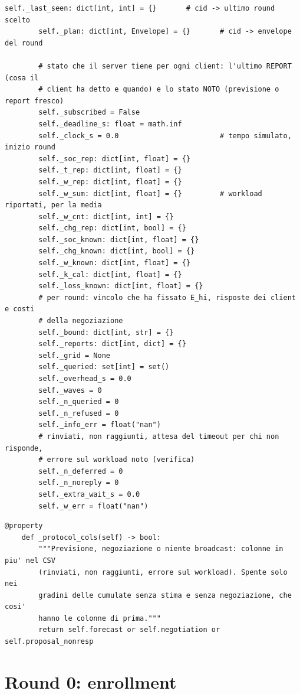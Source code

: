 \documentclass[11pt,a4paper]{article}
\begin{document}
\begin{lstlisting}[style=py,firstnumber=212,caption={\texttt{tesifl/strategies/sage\_smart.py}, lines 212--312}]
        self._last_seen: dict[int, int] = {}       # cid -> ultimo round scelto
        self._plan: dict[int, Envelope] = {}       # cid -> envelope del round

        # stato che il server tiene per ogni client: l'ultimo REPORT (cosa il
        # client ha detto e quando) e lo stato NOTO (previsione o report fresco)
        self._subscribed = False
        self._deadline_s: float = math.inf
        self._clock_s = 0.0                        # tempo simulato, inizio round
        self._soc_rep: dict[int, float] = {}
        self._t_rep: dict[int, float] = {}
        self._w_rep: dict[int, float] = {}
        self._w_sum: dict[int, float] = {}         # workload riportati, per la media
        self._w_cnt: dict[int, int] = {}
        self._chg_rep: dict[int, bool] = {}
        self._soc_known: dict[int, float] = {}
        self._chg_known: dict[int, bool] = {}
        self._w_known: dict[int, float] = {}
        self._k_cal: dict[int, float] = {}
        self._loss_known: dict[int, float] = {}
        # per round: vincolo che ha fissato E_hi, risposte dei client e costi
        # della negoziazione
        self._bound: dict[int, str] = {}
        self._reports: dict[int, dict] = {}
        self._grid = None
        self._queried: set[int] = set()
        self._overhead_s = 0.0
        self._waves = 0
        self._n_queried = 0
        self._n_refused = 0
        self._info_err = float("nan")
        # rinviati, non raggiunti, attesa del timeout per chi non risponde,
        # errore sul workload noto (verifica)
        self._n_deferred = 0
        self._n_noreply = 0
        self._extra_wait_s = 0.0
        self._w_err = float("nan")
\end{lstlisting}

\begin{lstlisting}[style=py,firstnumber=314,caption={\texttt{tesifl/strategies/sage\_smart.py}, lines 314--320}]
    @property
    def _protocol_cols(self) -> bool:
        """Previsione, negoziazione o niente broadcast: colonne in piu' nel CSV
        (rinviati, non raggiunti, errore sul workload). Spente solo nei
        gradini delle cumulate senza stima e senza negoziazione, che cosi'
        hanno le colonne di prima."""
        return self.forecast or self.negotiation or self.proposal_nonresp
\end{lstlisting}

\newpage
\section{Round 0: enrollment}
\label{sec:enroll}
\end{document}
